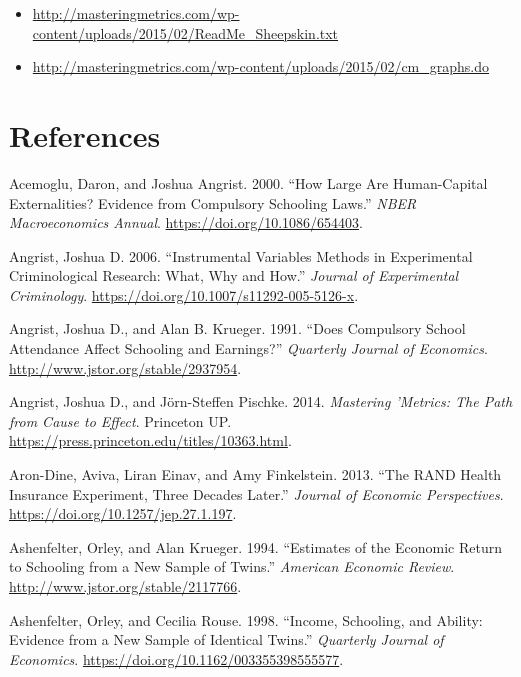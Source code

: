 \documentclass[]{book}
\providecommand{\tightlist}{%
  \setlength{\itemsep}{0pt}\setlength{\parskip}{0pt}}
\theoremstyle{definition}
\theoremstyle{definition}
\theoremstyle{definition}
\theoremstyle{remark}
\begin{document}
\begin{itemize}
\tightlist
\item
  \url{http://masteringmetrics.com/wp-content/uploads/2015/02/ReadMe_Sheepskin.txt}
\item
  \url{http://masteringmetrics.com/wp-content/uploads/2015/02/cm_graphs.do}
\end{itemize}

\hypertarget{references-10}{%
\chapter*{References}\label{references-10}}

\hypertarget{refs}{}
\leavevmode\hypertarget{ref-AcemogluAngrist2000}{}%
Acemoglu, Daron, and Joshua Angrist. 2000. ``How Large Are Human-Capital
Externalities? Evidence from Compulsory Schooling Laws.'' \emph{NBER
Macroeconomics Annual}. \url{https://doi.org/10.1086/654403}.

\leavevmode\hypertarget{ref-Angrist2006}{}%
Angrist, Joshua D. 2006. ``Instrumental Variables Methods in
Experimental Criminological Research: What, Why and How.'' \emph{Journal
of Experimental Criminology}.
\url{https://doi.org/10.1007/s11292-005-5126-x}.

\leavevmode\hypertarget{ref-AngristKrueger1991}{}%
Angrist, Joshua D., and Alan B. Krueger. 1991. ``Does Compulsory School
Attendance Affect Schooling and Earnings?'' \emph{Quarterly Journal of
Economics}. \url{http://www.jstor.org/stable/2937954}.

\leavevmode\hypertarget{ref-AngristPischke2014}{}%
Angrist, Joshua D., and Jörn-Steffen Pischke. 2014. \emph{Mastering
'Metrics: The Path from Cause to Effect}. Princeton UP.
\url{https://press.princeton.edu/titles/10363.html}.

\leavevmode\hypertarget{ref-Aron-DineEinavEtAl2013}{}%
Aron-Dine, Aviva, Liran Einav, and Amy Finkelstein. 2013. ``The RAND
Health Insurance Experiment, Three Decades Later.'' \emph{Journal of
Economic Perspectives}. \url{https://doi.org/10.1257/jep.27.1.197}.

\leavevmode\hypertarget{ref-AshenfelterKrueger1994}{}%
Ashenfelter, Orley, and Alan Krueger. 1994. ``Estimates of the Economic
Return to Schooling from a New Sample of Twins.'' \emph{American
Economic Review}. \url{http://www.jstor.org/stable/2117766}.

\leavevmode\hypertarget{ref-AshenfelterRouse1998}{}%
Ashenfelter, Orley, and Cecilia Rouse. 1998. ``Income, Schooling, and
Ability: Evidence from a New Sample of Identical Twins.''
\emph{Quarterly Journal of Economics}.
\url{https://doi.org/10.1162/003355398555577}.
\end{document}
